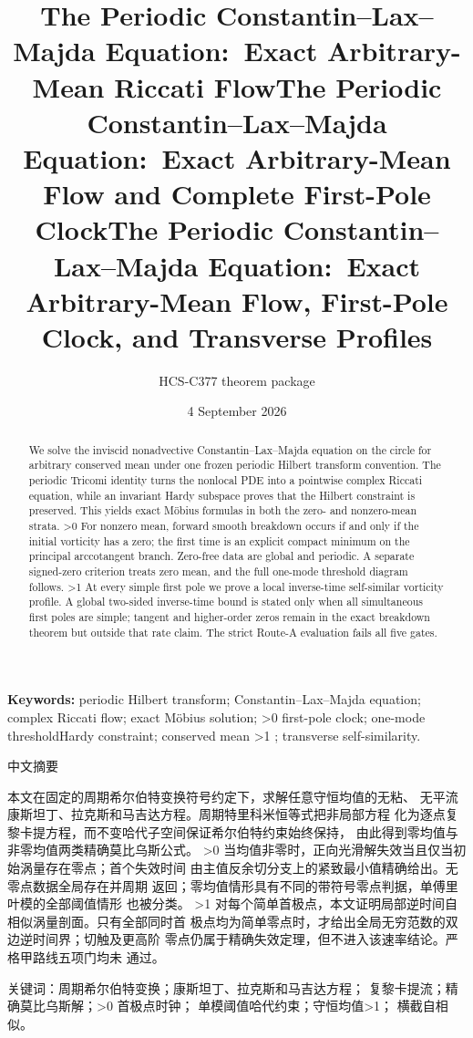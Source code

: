 \documentclass[10pt]{article}
\title{The Periodic Constantin--Lax--Majda Equation:\
Exact Arbitrary-Mean Riccati Flow}
\title{The Periodic Constantin--Lax--Majda Equation:\
Exact Arbitrary-Mean Flow and Complete First-Pole Clock}
\title{The Periodic Constantin--Lax--Majda Equation:\
Exact Arbitrary-Mean Flow, First-Pole Clock, and Transverse Profiles}
\author{HCS-C377 theorem package}
\date{4 September 2026}
\begin{document}
\maketitle

\begin{abstract}
We solve the inviscid nonadvective Constantin--Lax--Majda equation on the
circle for arbitrary conserved mean under one frozen periodic Hilbert
transform convention.  The periodic Tricomi identity turns the nonlocal PDE
into a pointwise complex Riccati equation, while an invariant Hardy
subspace proves that the Hilbert constraint is preserved.  This yields
exact M\"obius formulas in both the zero- and nonzero-mean strata.
\ifnum\CRevisionRound>0
For nonzero mean, forward smooth breakdown occurs if and only if the
initial vorticity has a zero; the first time is an explicit compact minimum
on the principal arccotangent branch.  Zero-free data are global and
periodic.  A separate signed-zero criterion treats zero mean, and the full
one-mode threshold diagram follows.
\fi
\ifnum\CRevisionRound>1
At every simple first pole we prove a local inverse-time self-similar
vorticity profile.  A global two-sided inverse-time bound is stated only
when all simultaneous first poles are simple; tangent and higher-order
zeros remain in the exact breakdown theorem but outside that rate claim.
The strict Route-A evaluation fails all five gates.
\fi
\end{abstract}

\par\smallskip\noindent
\textbf{Keywords:} periodic Hilbert transform; Constantin--Lax--Majda
equation; complex Riccati flow; exact M\"obius solution;
\ifnum\CRevisionRound>0 first-pole clock; one-mode threshold\else Hardy
constraint; conserved mean\fi
\ifnum\CRevisionRound>1 ; transverse self-similarity\fi.

\begin{otherlanguage}{chinese-simplified}
\begin{center}{\large 中文摘要}\end{center}
\begin{sloppypar}
本文在固定的周期希尔伯特变换符号约定下，求解任意守恒均值的无粘、
无平流康斯坦丁、拉克斯和马吉达方程。周期特里科米恒等式把非局部方程
化为逐点复黎卡提方程，而不变哈代子空间保证希尔伯特约束始终保持，
由此得到零均值与非零均值两类精确莫比乌斯公式。
\ifnum\CRevisionRound>0
当均值非零时，正向光滑解失效当且仅当初始涡量存在零点；首个失效时间
由主值反余切分支上的紧致最小值精确给出。无零点数据全局存在并周期
返回；零均值情形具有不同的带符号零点判据，单傅里叶模的全部阈值情形
也被分类。
\fi
\ifnum\CRevisionRound>1
对每个简单首极点，本文证明局部逆时间自相似涡量剖面。只有全部同时首
极点均为简单零点时，才给出全局无穷范数的双边逆时间界；切触及更高阶
零点仍属于精确失效定理，但不进入该速率结论。严格甲路线五项门均未
通过。
\fi
\end{sloppypar}

\par\smallskip
\noindent 关键词：周期希尔伯特变换；康斯坦丁、拉克斯和马吉达方程；
复黎卡提流；精确莫比乌斯解；\ifnum\CRevisionRound>0 首极点时钟；
单模阈值\else 哈代约束；守恒均值\fi\ifnum\CRevisionRound>1；
横截自相似\fi。
\end{otherlanguage}
\end{document}
